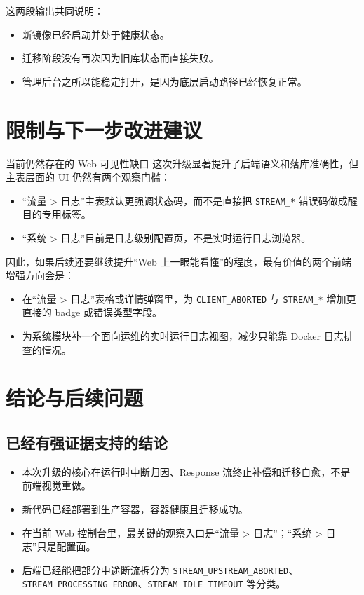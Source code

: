 \documentclass[a4paper]{article}
\begin{document}
这两段输出共同说明：
\begin{itemize}
\item 新镜像已经启动并处于健康状态。
\item 迁移阶段没有再次因为旧库状态而直接失败。
\item 管理后台之所以能稳定打开，是因为底层启动路径已经恢复正常。
\end{itemize}

\section{限制与下一步改进建议}

\begin{riskbox}{当前仍然存在的 Web 可见性缺口}
这次升级显著提升了后端语义和落库准确性，但主表层面的 UI 仍然有两个观察门槛：
\begin{itemize}
\item “流量 > 日志”主表默认更强调状态码，而不是直接把 \texttt{STREAM\_*} 错误码做成醒目的专用标签。
\item “系统 > 日志”目前是日志级别配置页，不是实时运行日志浏览器。
\end{itemize}
\end{riskbox}

因此，如果后续还要继续提升“Web 上一眼能看懂”的程度，最有价值的两个前端增强方向会是：
\begin{itemize}
\item 在“流量 > 日志”表格或详情弹窗里，为 \texttt{CLIENT\_ABORTED} 与 \texttt{STREAM\_*} 增加更直接的 badge 或错误类型字段。
\item 为系统模块补一个面向运维的实时运行日志视图，减少只能靠 Docker 日志排查的情况。
\end{itemize}

\section{结论与后续问题}

\subsection*{已经有强证据支持的结论}
\begin{itemize}
\item 本次升级的核心在运行时中断归因、Response 流终止补偿和迁移自愈，不是前端视觉重做。
\item 新代码已经部署到生产容器，容器健康且迁移成功。
\item 在当前 Web 控制台里，最关键的观察入口是“流量 > 日志”；“系统 > 日志”只是配置面。
\item 后端已经能把部分中途断流拆分为 \texttt{STREAM\_UPSTREAM\_ABORTED}、\texttt{STREAM\_PROCESSING\_ERROR}、\texttt{STREAM\_IDLE\_TIMEOUT} 等分类。
\end{itemize}
\end{document}
